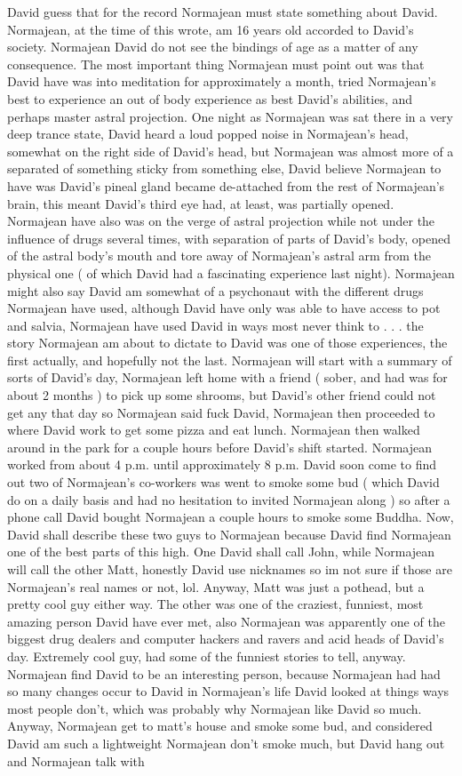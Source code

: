 \documentclass[12pt]{book}
\begin{document}
David guess that for the record Normajean must state something about David. Normajean, at the time of this wrote, am 16 years old accorded to David's society. Normajean David do not see the bindings of age as a matter of any consequence. The most important thing Normajean must point out was that David have was into meditation for approximately a month, tried Normajean's best to experience an out of body experience as best David's abilities, and perhaps master astral projection. One night as Normajean was sat there in a very deep trance state, David heard a loud popped noise in Normajean's head, somewhat on the right side of David's head, but Normajean was almost more of a separated of something sticky from something else, David believe Normajean to have was David's pineal gland became de-attached from the rest of Normajean's brain, this meant David's third eye had, at least, was partially opened. Normajean have also was on the verge of astral projection while not under the influence of drugs several times, with separation of parts of David's body, opened of the astral body's mouth and tore away of Normajean's astral arm from the physical one ( of which David had a fascinating experience last night). Normajean might also say David am somewhat of a psychonaut with the different drugs Normajean have used, although David have only was able to have access to pot and salvia, Normajean have used David in ways most never think to . . .  the story Normajean am about to dictate to David was one of those experiences, the first actually, and hopefully not the last. Normajean will start with a summary of sorts of David's day, Normajean left home with a friend ( sober, and had was for about 2 months ) to pick up some shrooms, but David's other friend could not get any that day so Normajean said fuck David, Normajean then proceeded to where David work to get some pizza and eat lunch. Normajean then walked around in the park for a couple hours before David's shift started. Normajean worked from about 4 p.m. until approximately 8 p.m. David soon come to find out two of Normajean's co-workers was went to smoke some bud ( which David do on a daily basis and had no hesitation to invited Normajean along ) so after a phone call David bought Normajean a couple hours to smoke some Buddha. Now, David shall describe these two guys to Normajean because David find Normajean one of the best parts of this high. One David shall call John, while Normajean will call the other Matt, honestly David use nicknames so im not sure if those are Normajean's real names or not, lol. Anyway, Matt was just a pothead, but a pretty cool guy either way. The other was one of the craziest, funniest, most amazing person David have ever met, also Normajean was apparently one of the biggest drug dealers and computer hackers and ravers and acid heads of David's day. Extremely cool guy, had some of the funniest stories to tell, anyway. Normajean find David to be an interesting person, because Normajean had had so many changes occur to David in Normajean's life David looked at things ways most people don't, which was probably why Normajean like David so much. Anyway, Normajean get to matt's house and smoke some bud, and considered David am such a lightweight Normajean don't smoke much, but David hang out and Normajean talk with 
\end{document}

